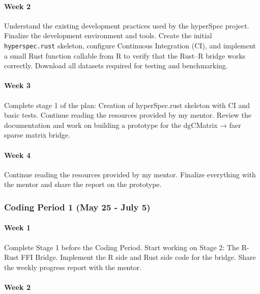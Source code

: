 \documentclass[11pt]{article}
\begin{document}
\hypertarget{week-2-1}{%
\paragraph{Week 2}\label{week-2-1}}

\hfill\break
Understand the existing development practices used by the hyperSpec
project. Finalize the development environment and tools. Create the
initial \texttt{hyperspec.rust} skeleton, configure Continuous
Integration (CI), and implement a small Rust function callable from R to
verify that the Rust--R bridge works correctly. Download all datasets
required for testing and benchmarking.

\hypertarget{week-3-1}{%
\paragraph{Week 3}\label{week-3-1}}

\hfill\break
Complete stage 1 of the plan: Creation of hyperSpec.rust skeleton with
CI and basic tests. Continue reading the resources provided by my
mentor. Review the documentation and work on building a prototype for
the dgCMatrix → faer sparse matrix bridge.

\hypertarget{week-4-1}{%
\paragraph{Week 4}\label{week-4-1}}

\hfill\break
Continue reading the resources provided by my mentor. Finalize
everything with the mentor and share the report on the prototype.

\hypertarget{coding-period-1-may-25---july-5}{%
\subsubsection{Coding Period 1 (May 25 - July
5)}\label{coding-period-1-may-25---july-5}}

\hypertarget{week-1-2}{%
\paragraph{Week 1}\label{week-1-2}}

\hfill\break
Complete Stage 1 before the Coding Period. Start working on Stage 2: The
R-Rust FFI Bridge. Implement the R side and Rust side code for the
bridge. Share the weekly progress report with the mentor.

\hypertarget{week-2-2}{%
\paragraph{Week 2}\label{week-2-2}}
\end{document}
